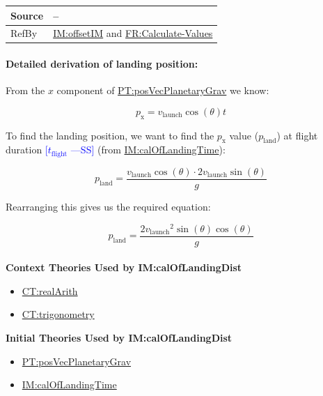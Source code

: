 \documentclass[12pt]{article}
\newcommand{\authornote}[3]{\textcolor{#1}{[#3 ---#2]}}
\newcommand{\authornote}[3]{}
\newcommand{\wss}[1]{\authornote{blue}{SS}{#1}}
\begin{document}
\begin{minipage}{\textwidth}
\begin{tabular}{>{\raggedright}p{}>{\raggedright\arraybackslash}p{}}
\\ \midrule
Source & --
         
\\ \midrule
RefBy & \hyperref[IM:offsetIM]{IM:offsetIM} and \hyperref[calcValues]{FR:Calculate-Values}
        
\\ \bottomrule
\end{tabular}
\end{minipage}

\paragraph{Detailed derivation of landing position:}
\label{IM:calOfLandingDistDeriv}

From the $x$ component of \hyperref[PT:posVecPlanetaryGrav]{PT:posVecPlanetaryGrav} we know:

\begin{displaymath}
p_\text{x} = v_\text{launch} \cos (\theta) t
\end{displaymath}

To find the landing position, we want to find the ${p_{\text{x}}}$ value
(${p_{\text{land}}}$) at flight duration \wss{$t_\text{flight}$} (from
\hyperref[IM:calOfLandingTime]{IM:calOfLandingTime}):

\begin{displaymath}
{p_{\text{land}}}=\frac{{v_{\text{launch}}} \cos\left(θ\right)\cdot{}2 {v_{\text{launch}}} \sin\left(θ\right)}{g}
\end{displaymath}

Rearranging this gives us the required equation:

\begin{displaymath}
{p_{\text{land}}}=\frac{2 {v_{\text{launch}}}^{2} \sin\left(θ\right) \cos\left(θ\right)}{g}
\end{displaymath}
~\\

\noindent \textbf{Context Theories Used by IM:calOfLandingDist}

\begin{itemize}
\item \hyperref[CT:realArith]{CT:realArith}
\item \hyperref[CT:trigonometry]{CT:trigonometry}
\end{itemize}

\noindent \textbf{Initial Theories Used by IM:calOfLandingDist}

\begin{itemize}
\item \hyperref[PT:posVecPlanetaryGrav]{PT:posVecPlanetaryGrav}
\item \hyperref[IM:calOfLandingTime]{IM:calOfLandingTime}
\end{itemize}
\end{document}
